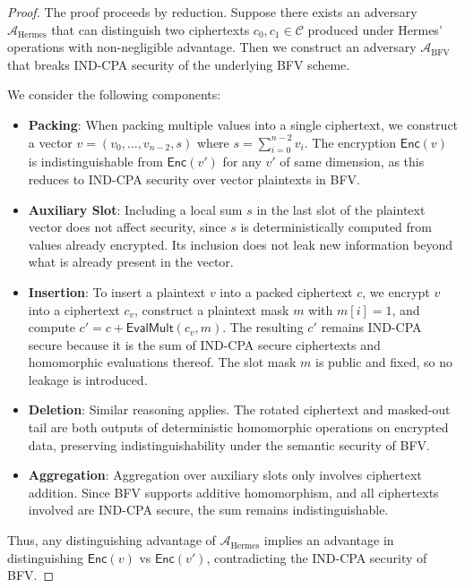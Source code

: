 \documentclass[sigconf,nonacm]{acmart}
\begin{document}
\begin{proof}
The proof proceeds by reduction. Suppose there exists an adversary $\mathcal{A}_\text{Hermes}$ that can distinguish two ciphertexts $c_0, c_1 \in \mathcal{C}$ produced under Hermes’ operations with non-negligible advantage. Then we construct an adversary $\mathcal{A}_\text{BFV}$ that breaks IND-CPA security of the underlying BFV scheme.

We consider the following components:
\begin{itemize}
  \item \textbf{Packing}: When packing multiple values into a single ciphertext, we construct a vector $v = (v_0, \dots, v_{n-2}, s)$ where $s = \sum_{i=0}^{n-2} v_i$. The encryption $\mathsf{Enc}(v)$ is indistinguishable from $\mathsf{Enc}(v')$ for any $v'$ of same dimension, as this reduces to IND-CPA security over vector plaintexts in BFV.

  \item \textbf{Auxiliary Slot}: Including a local sum $s$ in the last slot of the plaintext vector does not affect security, since $s$ is deterministically computed from values already encrypted. Its inclusion does not leak new information beyond what is already present in the vector.

  \item \textbf{Insertion}: To insert a plaintext $v$ into a packed ciphertext $c$, we encrypt $v$ into a ciphertext $c_v$, construct a plaintext mask $m$ with $m[i] = 1$, and compute $c' = c + \mathsf{EvalMult}(c_v, m)$. The resulting $c'$ remains IND-CPA secure because it is the sum of IND-CPA secure ciphertexts and homomorphic evaluations thereof. The slot mask $m$ is public and fixed, so no leakage is introduced.

  \item \textbf{Deletion}: Similar reasoning applies. The rotated ciphertext and masked-out tail are both outputs of deterministic homomorphic operations on encrypted data, preserving indistinguishability under the semantic security of BFV.

  \item \textbf{Aggregation}: Aggregation over auxiliary slots only involves ciphertext addition. Since BFV supports additive homomorphism, and all ciphertexts involved are IND-CPA secure, the sum remains indistinguishable.
\end{itemize}

Thus, any distinguishing advantage of $\mathcal{A}_\text{Hermes}$ implies an advantage in distinguishing $\mathsf{Enc}(v)$ vs $\mathsf{Enc}(v')$, contradicting the IND-CPA security of BFV.
\end{proof}
\end{document}
